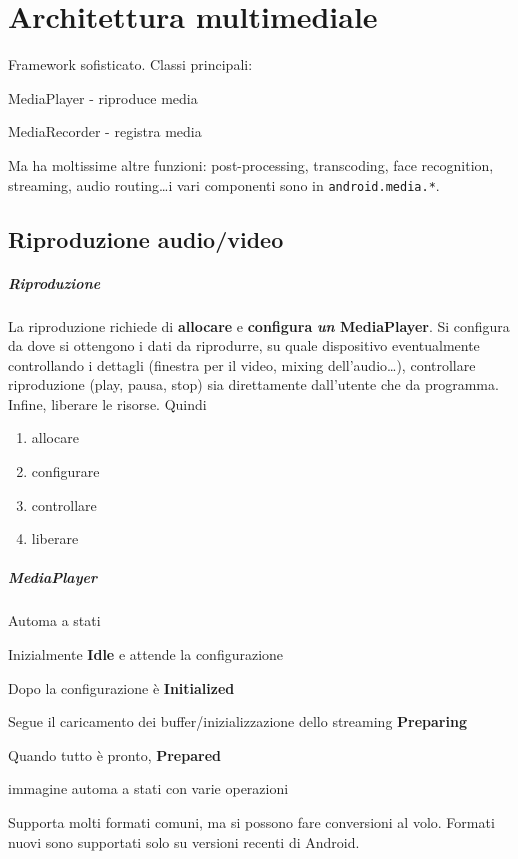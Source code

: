 \documentclass[10pt]{book}
\begin{document}
\chapter{Architettura multimediale}
Framework sofisticato. Classi principali:
\begin{list}{}{}
	\item MediaPlayer - riproduce media
	\item MediaRecorder - registra media
\end{list}
Ma ha moltissime altre funzioni: post-processing, transcoding, face recognition, streaming, audio routing\ldots i vari componenti sono in \texttt{android.media.*}.
\section{Riproduzione audio/video}
\paragraph{Riproduzione} La riproduzione richiede di \textbf{allocare} e \textbf{configura} \textbf{\textit{un} MediaPlayer}. Si configura da dove si ottengono i dati da riprodurre, su quale dispositivo eventualmente controllando i dettagli (finestra per il video, mixing dell'audio\ldots), controllare riproduzione (play, pausa, stop) sia direttamente dall'utente che da programma.\\
Infine, liberare le risorse.
Quindi \begin{enumerate}
	\item allocare
	\item configurare
	\item controllare
	\item liberare
\end{enumerate}
\paragraph{MediaPlayer} Automa a stati
\begin{list}{}{}
	\item Inizialmente \textbf{Idle} e attende la configurazione
	\item Dopo la configurazione è \textbf{Initialized}
	\item Segue il caricamento dei buffer/inizializzazione dello streaming \textbf{Preparing}
	\item Quando tutto è pronto, \textbf{Prepared}
\end{list}
\begin{center}
	immagine automa a stati con varie operazioni
\end{center}
Supporta molti formati comuni, ma si possono fare conversioni al volo. Formati nuovi sono supportati solo su versioni recenti di Android.
\end{document}

